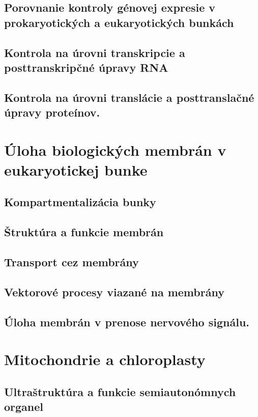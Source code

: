 \subsection{Porovnanie kontroly génovej expresie v prokaryotických a eukaryotických bunkách}

\subsection{Kontrola na úrovni transkripcie a posttranskripčné úpravy RNA}

\subsection{Kontrola na úrovni translácie a posttranslačné úpravy proteínov.}

\section{Úloha biologických membrán v eukaryotickej bunke}

\subsection{Kompartmentalizácia bunky}

\subsection{Štruktúra a funkcie membrán}

\subsection{Transport cez membrány}

\subsection{Vektorové procesy viazané na membrány}

\subsection{Úloha membrán v prenose nervového signálu.}

\section{Mitochondrie a chloroplasty}

\subsection{Ultraštruktúra a funkcie semiautonómnych organel}

